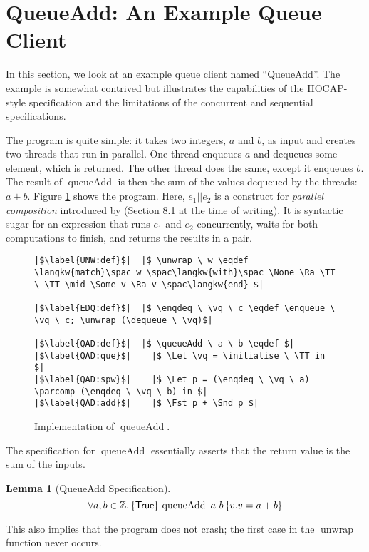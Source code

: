 \documentclass[a4paper, 10pt]{report}
\theoremstyle{definition}
\newtheorem{lemma}[theorem]{Lemma}
\newcommand{\initialise}{\operatorname{initialize}}
\newcommand{\enqueue}{\operatorname{enqueue}}
\newcommand{\dequeue}{\operatorname{dequeue}}
\newcommand{\unwrap}{\operatorname{unwrap}}
\newcommand{\enqdeq}{\operatorname{enqdeq}}
\newcommand{\queueAdd}{\operatorname{queueAdd}}
\newcommand{\parcomp}{\ensuremath{\mathbin{||}}}
\newcommand{\vq}{v_q}
\begin{document}
\section{QueueAdd: An Example Queue Client}
\label{QueueSpecs:section:queueadd}

In this section, we look at an example queue client named ``QueueAdd''. The example is somewhat contrived but illustrates the capabilities of the HOCAP-style specification and the limitations of the concurrent and sequential specifications.

The program is quite simple: it takes two integers, $a$ and $b$, as input and creates two threads that run in parallel. One thread enqueues $a$ and dequeues some element, which is returned. The other thread does the same, except it enqueues $b$. The result of $\queueAdd$ is then the sum of the values dequeued by the threads: $a + b$. Figure \ref{QueueSpecs:queueadd:code} shows the program. Here, $e_1 \parcomp e_2$ is a construct for \textit{parallel composition} introduced by \citet{gentleiris} (Section 8.1 at the time of writing). It is syntactic sugar for an expression that runs $e_1$ and $e_2$ concurrently, waits for both computations to finish, and returns the results in a pair.

\begin{figure}
\begin{verbatim}
|$\label{UNW:def}$|  |$ \unwrap \ w \eqdef \langkw{match}\spac w \spac\langkw{with}\spac \None \Ra \TT \ \TT \mid \Some v \Ra v \spac\langkw{end} $|

|$\label{EDQ:def}$|  |$ \enqdeq \ \vq \ c \eqdef \enqueue \ \vq \ c; \unwrap (\dequeue \ \vq)$|

|$\label{QAD:def}$|  |$ \queueAdd \ a \ b \eqdef $|
|$\label{QAD:que}$|    |$ \Let \vq = \initialise \ \TT in $|
|$\label{QAD:spw}$|    |$ \Let p = (\enqdeq \ \vq \ a) \parcomp (\enqdeq \ \vq \ b) in $|
|$\label{QAD:add}$|    |$ \Fst p + \Snd p $|
\end{verbatim}
\caption{Implementation of $\queueAdd$.}
\label{QueueSpecs:queueadd:code}
\end{figure}

The specification for $\queueAdd$ essentially asserts that the return value is the sum of the inputs.
\begin{lemma}[QueueAdd Specification]\label{QueueSpecs:spec:queueadd}
  \begin{equation*}
    \All a, b \in \mathbb{Z} . \hoare{\TRUE}{\queueAdd \ a \ b}{v . v = a + b}
  \end{equation*}
\end{lemma}
\noindent This also implies that the program does not crash; the first case in the $\unwrap$ function never occurs.
\end{document}
